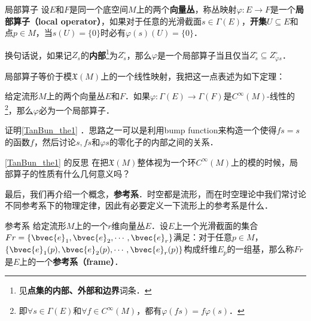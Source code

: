 \begin{definition}{局部算子}
设$E$和$F$是同一个底空间$M$上的两个\textbf{向量丛}，称丛映射$\varphi:E\rightarrow F$是一个\textbf{局部算子（local operator）}，如果对于任意的光滑截面$s\in\Gamma(E)$，\textbf{开集}$U\subseteq E$和点$p\in M$，当$s(U)=\{0\}$时必有$\varphi(s)(U)=\{0\}$．

换句话说，如果记$Z_s$的\textbf{内部}\footnote{见\textbf{点集的内部、外部和边界}词条．}为$Z_s^\circ$，那么$\varphi$是一个局部算子当且仅当$Z_s^\circ\subseteq Z_{\varphi{s}}^\circ$．
\end{definition}

局部算子等价于模$\mathfrak{X}(M)$上的一个线性映射，我把这一点表述为如下定理：

\begin{theorem}{}\label{TanBun_the1}
给定流形$M$上的两个向量丛$E$和$F$．如果$\varphi:\Gamma(E)\rightarrow\Gamma(F)$是$C^\infty(M)$-线性的\footnote{即$\forall s\in\Gamma(E)$和$\forall f\in C^\infty(M)$，都有$\varphi(fs)=f\varphi(s)$．}，那么$\varphi$必为一个局部算子．
\end{theorem}

\begin{exercise}{}
证明\autoref{TanBun_the1} ．思路之一可以是利用bump function来构造一个使得$fs=s$的函数$f$，然后讨论$s, fs$和$\varphi{s}$的零化子的内部之间的关系．
\end{exercise}

\begin{exercise}{\autoref{TanBun_the1} 的反思}
在把$\mathfrak{X}(M)$整体视为一个环$C^\infty(M)$上的模的时候，局部算子的性质有什么几何意义吗？
\end{exercise}

最后，我们再介绍一个概念，\textbf{参考系}．时空都是流形，而在时空理论中我们常讨论不同参考系下的物理定律，因此有必要定义一下流形上的参考系是什么．

\begin{definition}{参考系}
给定流形$M$上的一个$r$维向量丛$E$．设$E$上一个光滑截面的集合$Fr=\{\bvec{e}_1, \bvec{e}_2, \cdots, \bvec{e}_r\}$满足：对于任意$p\in M$，$\{\bvec{e}_1(p), \bvec{e}_2(p), \cdots, \bvec{e}_r(p)\}$构成纤维$E_p$的一组基，那么称$Fr$是$E$上的一个\textbf{参考系（frame）}．
\end{definition}










